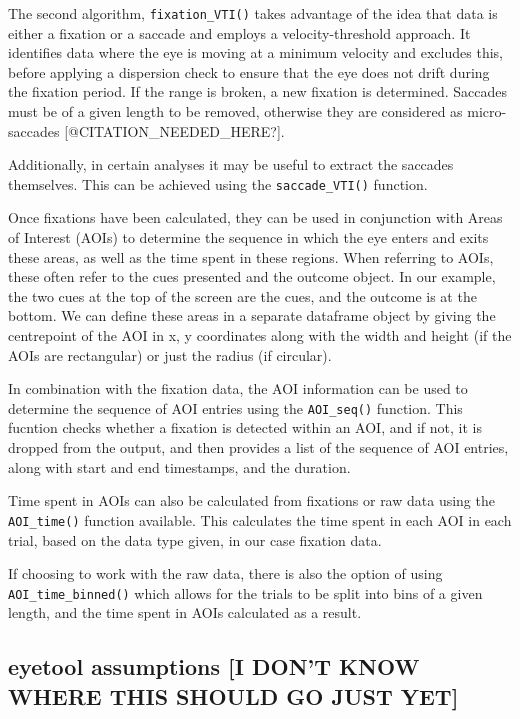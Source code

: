 \documentclass[
  man,
  floatsintext,
  longtable,
  nolmodern,
  notxfonts,
  notimes,
  colorlinks=true,linkcolor=blue,citecolor=blue,urlcolor=blue]{apa7}
\begin{document}
The second algorithm, \texttt{fixation\_VTI()} takes advantage of the
idea that data is either a fixation or a saccade and employs a
velocity-threshold approach. It identifies data where the eye is moving
at a minimum velocity and excludes this, before applying a dispersion
check to ensure that the eye does not drift during the fixation period.
If the range is broken, a new fixation is determined. Saccades must be
of a given length to be removed, otherwise they are considered as
micro-saccades {[}@CITATION\_NEEDED\_HERE?{]}.

Additionally, in certain analyses it may be useful to extract the
saccades themselves. This can be achieved using the
\texttt{saccade\_VTI()} function.

Once fixations have been calculated, they can be used in conjunction
with Areas of Interest (AOIs) to determine the sequence in which the eye
enters and exits these areas, as well as the time spent in these
regions. When referring to AOIs, these often refer to the cues presented
and the outcome object. In our example, the two cues at the top of the
screen are the cues, and the outcome is at the bottom. We can define
these areas in a separate dataframe object by giving the centrepoint of
the AOI in x, y coordinates along with the width and height (if the AOIs
are rectangular) or just the radius (if circular).

In combination with the fixation data, the AOI information can be used
to determine the sequence of AOI entries using the \texttt{AOI\_seq()}
function. This fucntion checks whether a fixation is detected within an
AOI, and if not, it is dropped from the output, and then provides a list
of the sequence of AOI entries, along with start and end timestamps, and
the duration.

Time spent in AOIs can also be calculated from fixations or raw data
using the \texttt{AOI\_time()} function available. This calculates the
time spent in each AOI in each trial, based on the data type given, in
our case fixation data.

If choosing to work with the raw data, there is also the option of using
\texttt{AOI\_time\_binned()} which allows for the trials to be split
into bins of a given length, and the time spent in AOIs calculated as a
result.

\subsection{eyetool assumptions {[}I DON'T KNOW WHERE THIS SHOULD GO
JUST
YET{]}}\label{eyetool-assumptions-i-dont-know-where-this-should-go-just-yet}
\end{document}

